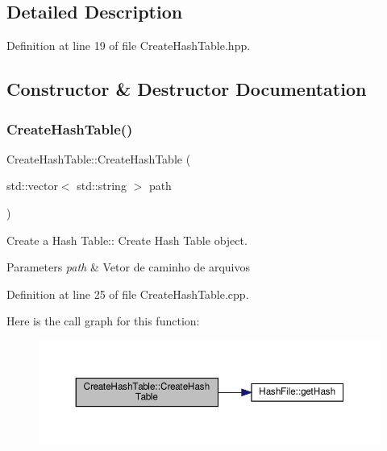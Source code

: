 \subsection{Detailed Description}


Definition at line 19 of file Create\+Hash\+Table.\+hpp.



\subsection{Constructor \& Destructor Documentation}
\mbox{\label{class_create_hash_table_a9cc25111eb98da7c68ff4dcff9cdd4ea}} 
\subsubsection{\texorpdfstring{Create\+Hash\+Table()}{CreateHashTable()}\hspace{0.1cm}{\footnotesize\ttfamily [1/2]}}
{\footnotesize\ttfamily Create\+Hash\+Table\+::\+Create\+Hash\+Table (\begin{DoxyParamCaption}\item[{std\+::vector$<$ std\+::string $>$}]{path }\end{DoxyParamCaption})}



Create a Hash Table\+:\+: Create Hash Table object. 


\begin{DoxyParams}{Parameters}
{\em path} & Vetor de caminho de arquivos \\
\hline
\end{DoxyParams}


Definition at line 25 of file Create\+Hash\+Table.\+cpp.

Here is the call graph for this function\+:
\nopagebreak
\begin{figure}[H]
\begin{center}
\leavevmode
\includegraphics[width=350pt]{d9/d9e/class_create_hash_table_a9cc25111eb98da7c68ff4dcff9cdd4ea_cgraph}
\end{center}
\end{figure}
\mbox{\label{class_create_hash_table_a3aac5164fee71508dbd12eaa4c81ab44}} 
